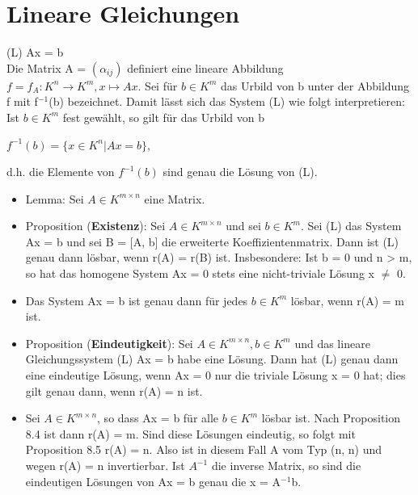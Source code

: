 \section{Lineare Gleichungen}
(L)  Ax = b\\
Die Matrix A = $(\alpha_{ij})$ definiert eine lineare Abbildung $f = f_A: K^n \to K^m, x \mapsto Ax$. Sei für $b \in K^m$ das Urbild von b unter der Abbildung f mit f$^{-1}$(b) bezeichnet. Damit lässt sich das System (L) wie folgt interpretieren: Ist $b \in K^m$ fest gewählt, so gilt für das Urbild von b
\begin{center}
$f^{-1}(b) = \{x \in K^n | Ax = b\}$,
\end{center}
d.h. die Elemente von $f^{-1}(b)$ sind genau die Lösung von (L).
\begin{itemize}
\item Lemma: Sei $A \in K^{m \times n}$ eine Matrix.
\item Proposition (\textbf{Existenz}): Sei $A \in K^{m \times n}$ und sei $b \in K^m$. Sei (L) das System Ax = b und sei B = [A, b] die erweiterte Koeffizientenmatrix. Dann ist (L) genau dann lösbar, wenn r(A) = r(B) ist. Insbesondere: Ist b = 0 und n > m, so hat das homogene System Ax = 0 stets eine nicht-triviale Lösung x $\neq$ 0.
\item
\begin{remark}
Das System Ax = b ist genau dann für jedes $b \in K^m$ lösbar, wenn r(A) = m ist.
\end{remark}
\item Proposition (\textbf{Eindeutigkeit}): Sei $A \in K^{m \times n},b \in K^m$ und das lineare Gleichungssystem (L) Ax = b habe eine Lösung. Dann hat (L) genau dann eine eindeutige Lösung, wenn Ax = 0 nur die triviale Lösung x = 0 hat; dies gilt genau dann, wenn r(A) = n ist.
\item
\begin{remark}
Sei $A \in K^{m \times n}$, so dass Ax = b für alle $b \in K^m$ lösbar ist. Nach Proposition 8.4 ist dann r(A) = m. Sind diese Lösungen eindeutig, so folgt mit Proposition 8.5 r(A) = n. Also ist in diesem Fall A vom Typ (n, n) und wegen r(A) = n invertierbar. Ist $A^{-1}$ die inverse Matrix, so sind die eindeutigen Lösungen von Ax = b genau die x = A$^{-1}$b.

\end{remark}
\end{itemize}
